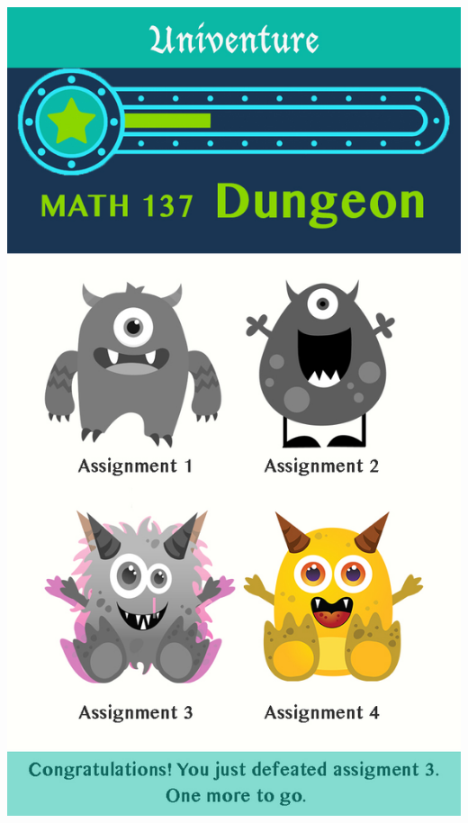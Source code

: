 \documentclass[landscape,archE,fontscale=0.29]{baposter} %
\begin{document}
\begin{poster}
{\begin{minipage}{0.26\linewidth}
\begin{center}
      \includegraphics[scale=0.10]{img/mini_moster.jpg}
    \end{center}
  \end{minipage}

}


\end{poster}
\end{document}
